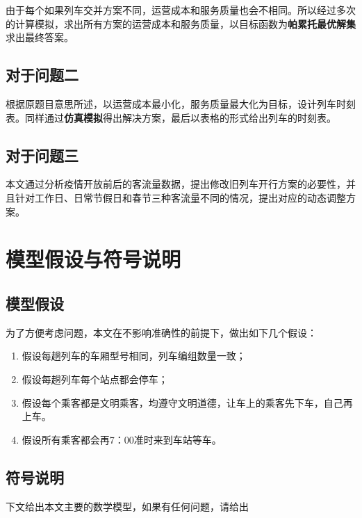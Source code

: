 由于每个如果列车交并方案不同，运营成本和服务质量也会不相同。所以经过多次的计算模拟，求出所有方案的运营成本和服务质量，以目标函数为\textbf{帕累托最优解集}求出最终答案。

\subsection{对于问题二}

根据原题目意思所述，以运营成本最小化，服务质量最大化为目标，设计列车时刻表。同样通过\textbf{仿真模拟}得出解决方案，最后以表格的形式给出列车的时刻表。

\subsection{对于问题三}

本文通过分析疫情开放前后的客流量数据，提出修改旧列车开行方案的必要性，并且针对工作日、日常节假日和春节三种客流量不同的情况，提出对应的动态调整方案。


%
%

\section{模型假设与符号说明}

\subsection{模型假设}

为了方便考虑问题，本文在不影响准确性的前提下，做出如下几个假设：

\begin{enumerate}
    \item 假设每趟列车的车厢型号相同，列车编组数量一致；
    \item 假设每趟列车每个站点都会停车；
    \item 假设每个乘客都是文明乘客，均遵守文明道德，让车上的乘客先下车，自己再上车。
    \item 假设所有乘客都会再7：00准时来到车站等车。
\end{enumerate}

\subsection{符号说明}

下文给出本文主要的数学模型，如果有任何问题，请给出

